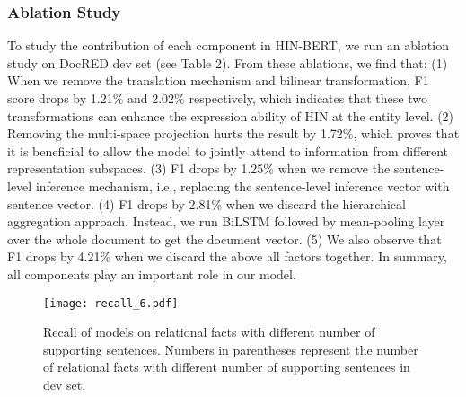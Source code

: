 \documentclass[runningheads]{llncs}
\begin{document}
\subsubsection{Ablation Study}
To study the contribution of each component in HIN-BERT, we run an ablation study on DocRED dev set (see Table 2). From these ablations, we find that:
(1) When we remove the translation mechanism and bilinear transformation, 
F1 score drops by  1.21\% and 2.02\% respectively,
which indicates that these two transformations can enhance the expression ability of HIN at the entity level.
(2) Removing the multi-space projection hurts the result by 1.72\%, which proves that it is beneficial to allow the model to jointly attend to information from different representation subspaces.
(3) F1 drops by 1.25\% when we remove the sentence-level inference mechanism, i.e., replacing the sentence-level inference vector with sentence vector. 
(4) F1 drops by 2.81\% when we discard the hierarchical aggregation approach. Instead, we run BiLSTM followed by mean-pooling layer over the whole document to get the document vector. 
(5) We also observe that F1 drops by 4.21\% when we discard the above all factors together.
In summary, all components play an important role in our model.
\begin{figure}[t]
	\centering
	\texttt{[image: recall\_6.pdf]}
	\protect\caption{Recall of models on relational facts with different number of supporting sentences. Numbers in parentheses represent the number of relational facts with different number of supporting sentences in dev set.}
	\label{Fig. 3}
\end{figure}
\end{document}
